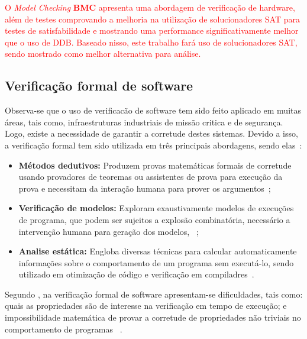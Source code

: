 \par
\textcolor{red}{O \textit{Model Checking} \textbf{BMC}\cite{biere1999symbolic} apresenta uma abordagem de verificação de hardware, além de testes comprovando a melhoria na utilização de solucionadores SAT para testes de satisfabilidade e mostrando uma performance significativamente melhor que o uso de DDB\cite{biere1999symbolic}. Baseado nisso, este trabalho fará uso de solucionadores SAT, sendo mostrado como melhor alternativa para análise.}
\subsection{Verificação formal de software}

Observa-se que o uso de verificacão de software tem sido feito aplicado em muitas áreas, tais como, infraestruturas industriais de missão critica e de segurança.  Logo, existe a necessidade de garantir a corretude destes sistemas. Devido a isso, a verificação formal tem sido utilizada em três principais abordagens, sendo elas~\cite{cousot2010gentle,d2008survey}:


\begin{itemize}
 \item \textbf{Métodos dedutivos:} Produzem provas matemáticas formais de corretude usando provadores de teoremas ou assistentes de prova para execução da prova e necessitam da interação humana para prover os argumentos~\cite{cousot2010gentle};
  \item \textbf{Verificação de modelos:} Exploram exaustivamente modelos de execuções de programa, que podem ser sujeitos a explosão combinatória, necessário a intervenção humana para geração dos modelos, \textcolor{red}{}~\cite{rocha2015verificaccao};
  \item \textbf{Analise estática:} Engloba diversas técnicas para calcular automaticamente informações sobre o comportamento de um programa sem executá-lo, sendo utilizado em otimização de código e verificação em compiladres~\cite{d2008survey}.
\end{itemize}

Segundo \citeauthor{rocha2015verificaccao}, na verificação formal de software apresentam-se dificuldades, tais como: quais as propriedades são de interesse na verificação em tempo de execução; e impossibilidade matemática de provar a corretude de propriedades não triviais no comportamento de programas 
~\cite{cousot2010gentle}. 

